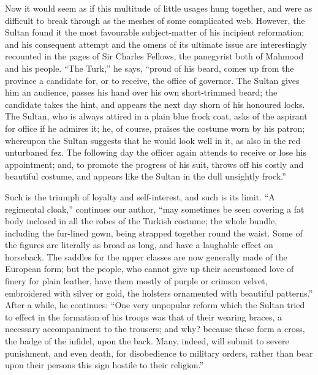 Now it would seem as if this
multitude of little usages hung together, and were as difficult to
break through as the meshes of some complicated web. However, the
Sultan found it the most favourable subject-matter of his incipient
reformation; and his consequent attempt and the omens of its ultimate
issue are interestingly recounted in the pages of Sir Charles Fellows,
the panegyrist both of Mahmood and his people. ``The Turk,'' he says, ``proud
of his beard, comes up from the province a candidate for, or to
receive, the office of governor. The Sultan gives him an audience,
passes his hand over his own short-trimmed beard; the candidate takes
the hint, and appears the next day shorn of his honoured locks. The
Sultan, who is always attired in a plain blue frock coat, asks of the
aspirant for office if he admires it; he, of course, praises the
costume worn by his patron; whereupon the Sultan suggests that he
would look well in it, as also in the red unturbaned fez. The
following day the officer again attends to receive or lose his
appointment; and, to promote the progress of his suit, throws off his
costly and beautiful costume, and appears like the Sultan in the dull
unsightly frock.''

Such is the triumph of loyalty
and self-interest, and such is its limit. ``A regimental cloak,''
continues our author, ``may sometimes be seen covering a fat body
inclosed in all the robes of the Turkish costume; the whole bundle,
including the fur-lined gown, being strapped together round the waist.
Some of the figures are literally as broad as long, and have a
laughable effect on horseback. The saddles for the upper classes are
now generally made of the European form; but the people, who
cannot give up their accustomed love of finery for plain leather, have
them mostly of purple or crimson velvet, embroidered with silver or
gold, the holsters ornamented with beautiful patterns.'' After a while,
he continues: ``One very unpopular reform which the Sultan tried to
effect in the formation of his troops was that of their wearing
braces, a necessary accompaniment to the trousers; and why? because
these form a cross, the badge of the infidel, upon the back. Many,
indeed, will submit to severe punishment, and even death, for
disobedience to military orders, rather than bear upon their persons
this sign hostile to their religion.''

